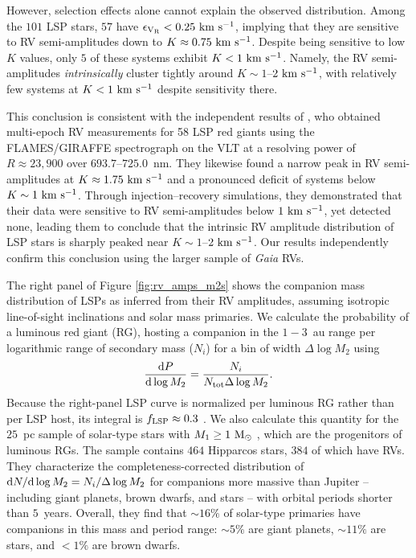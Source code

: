 \documentclass[trackchanges,twocolumn]{aastex631}
\begin{document}
However, selection effects alone cannot explain the observed distribution. Among the $101$ LSP stars, $57$ have $\epsilon_{\rm V_R}<0.25~{\rm km~s^{-1}}$, implying that they are sensitive to RV semi-amplitudes down to $K\approx0.75~{\rm km~s^{-1}}$. Despite being sensitive to low $K$ values, only $5$ of these systems exhibit $K<1~{\rm km~s^{-1}}$. Namely, the RV semi-amplitudes {\it intrinsically} cluster tightly around $K\sim1$--$2~{\rm km~s^{-1}}$, with relatively few systems at $K<1~{\rm km~s^{-1}}$ despite sensitivity there. 

This conclusion is consistent with the independent results of \citet{Nicholls09}, who obtained multi-epoch RV measurements for 58 LSP red giants using the FLAMES/GIRAFFE spectrograph on the VLT \citep{Pasquini02} at a resolving power of $R\approx23{,}900$ over $693.7$--$725.0$~nm. They likewise found a narrow peak in RV semi-amplitudes at $K\approx1.75~{\rm km~s^{-1}}$ and a pronounced deficit of systems below $K\sim1~{\rm km~s^{-1}}$. Through injection--recovery simulations, they demonstrated that their data were sensitive to RV semi-amplitudes below $1~{\rm km~s^{-1}}$, yet detected none, leading them to conclude that the intrinsic RV amplitude distribution of LSP stars is sharply peaked near $K\sim1$--$2~{\rm km~s^{-1}}$. Our results independently confirm this conclusion using the larger sample of {\it Gaia} RVs.

The right panel of Figure \ref{fig:rv_amps_m2s} shows the companion mass distribution of LSPs as inferred from their RV amplitudes, assuming isotropic line-of-sight inclinations and solar mass primaries. We calculate the probability of a luminous red giant (RG), hosting a companion in the $1-3$~au range per logarithmic range of secondary mass ($N_i$) for a bin of width $\Delta \log M_2$ using
\begin{equation}\label{eq:dn_dlogm}
    \frac{{\rm d}P}{{\rm d}\log M_2} = \frac{N_i}{N_{\rm tot}\Delta \log M_2}.
\end{equation}
Because the right-panel LSP curve is normalized per luminous RG rather than per LSP host, its integral is $f_{\rm LSP} \approx 0.3$ \citep[e.g.,][]{Wood99,Wood04,Pawlak21}.
We also calculate this quantity for the $25$~pc sample of solar-type stars with $M_1 \geq 1~{\rm M_\odot}$ \citep[][]{Grether06}, which are the progenitors of luminous RGs. The \citet{Grether06} sample contains $464$ Hipparcos stars, $384$ of which have RVs. They characterize the completeness-corrected distribution of ${\rm d}N/{\rm d}\log M_2 = N_i/\Delta \log M_2$ for companions more massive than Jupiter --  including giant planets, brown dwarfs, and stars -- with orbital periods shorter than $5$~years. Overall, they find that $\sim16\%$ of solar-type primaries have companions in this mass and period range: $\sim5\%$ are giant planets, $\sim11\%$ are stars, and $<1\%$ are brown dwarfs.
\end{document}
